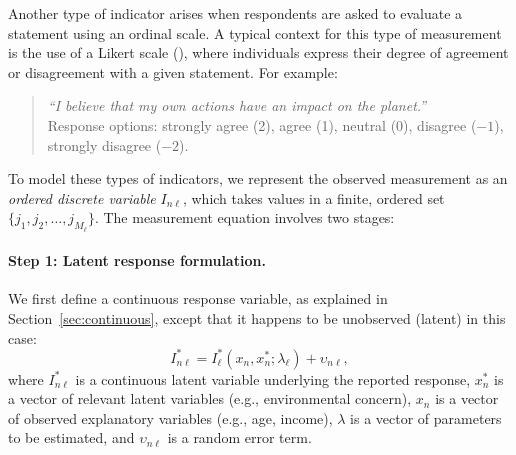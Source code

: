 \documentclass[12pt,a4paper]{article}
\begin{document}
Another type of indicator arises when respondents are asked to
evaluate a statement using an ordinal scale. A typical context for
this type of measurement is the use of a Likert scale
(\cite{likert1932technique}), where individuals express their degree of
agreement or disagreement with a given statement. For example:
\begin{quote}
\emph{``I believe that my own actions have an impact on the planet.''} \\
Response options: strongly agree (2), agree (1), neutral (0), disagree ($-1$), strongly disagree ($-2$).
\end{quote}


To model these types of indicators, we represent the observed
measurement as an \emph{ordered discrete variable} $I_{n\ell}$, which
takes values in a finite, ordered set $\{j_1, j_2, \ldots, j_{M_\ell}\}$. The
measurement equation involves two stages:

\paragraph{Step 1: Latent response formulation.} We first define a continuous response variable, as explained in Section~\ref{sec:continuous}, except that it happens to be unobserved (latent) in this case:
\begin{equation}
I^*_{n\ell} = I^*_\ell(x_n, x_n^*; \lambda_\ell) + \upsilon_{n\ell},
\end{equation}
where $I^*_{n\ell}$ is a continuous latent variable underlying the
reported response, $x_n^*$ is a vector of  relevant latent variables (e.g.,
environmental concern), $x_n$ is a vector of observed explanatory
variables (e.g., age, income), $\lambda$ is a vector of parameters to
be estimated, and $\upsilon_{n\ell}$ is a random error term.
\end{document}
